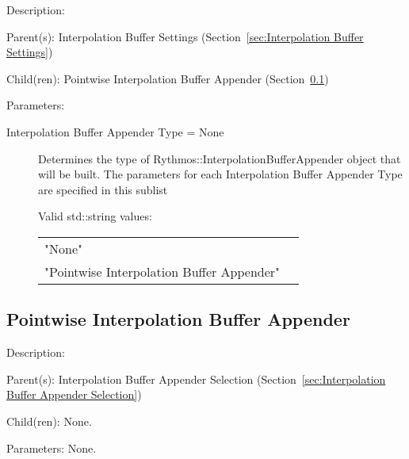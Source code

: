 \begin{list}{}
  {\setlength{\leftmargin}{1.0in}
   \setlength{\labelwidth}{0.75in}
   \setlength{\labelsep}{0.125in}}
  \item[Description:]
  \item[Parent(s):]
    Interpolation Buffer Settings (Section~\ref{sec:Interpolation Buffer Settings})
  \item[Child(ren):]
    Pointwise Interpolation Buffer Appender (Section~\ref{sec:Pointwise Interpolation Buffer Appender})
  \item[Parameters:]
    \begin{description}
      \item[Interpolation Buffer Appender Type = None] 
Determines the type of Rythmos::InterpolationBufferAppender object that will be built.
The parameters for each Interpolation Buffer Appender Type are specified in this sublist

  Valid std::string values:

      \begin{tabular}{lp{}}
      "None" & \\ 
      "Pointwise Interpolation Buffer Appender" & \\ 
      \end{tabular}
\end{description}

\end{list}

\subsection{Pointwise Interpolation Buffer Appender}
\label{sec:Pointwise Interpolation Buffer Appender}

\begin{list}{}
  {\setlength{\leftmargin}{1.0in}
   \setlength{\labelwidth}{0.75in}
   \setlength{\labelsep}{0.125in}}
  \item[Description:]
  \item[Parent(s):]
    Interpolation Buffer Appender Selection (Section~\ref{sec:Interpolation Buffer Appender Selection})
  \item[Child(ren):]
    None. 
  \item[Parameters:]
    None. 
\end{list}

